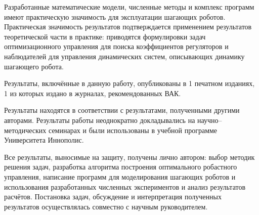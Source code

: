 Разработанные математические модели, численные методы и комплекс программ имеют практическую значимость для эксплуатации шагающих роботов. Практическая значимость результатов подтверждается применением результатов теоретической части в практике: приводятся формулировки задач оптимизационного управления для поиска коэффициентов регуляторов и наблюдателей для управления динамических систем, описывающих динамику шагающего робота. 

{\reliability} 

Результаты, включённые в данную работу, опубликованы в 1 печатном изданиях, 1 из которых издано в журналах, рекомендованных ВАК.
\begin{comment}
, 1 --- в периодических научных журналах, индексируемых \textit{Web of Science} и \textit{Scopus}. 
\end{comment}

Результаты находятся в соответствии с результатами, полученными другими авторами. Результаты работы неоднократно докладывались на научно--методических семинарах и были использованы в учебной программе Университета Иннополис.

{\contribution} 

Все результаты, выносимые на защиту, получены лично автором: выбор методик решения задач, разработка алгоритма построения оптимального робастного управления, написание программ для моделирования шагающих роботов и использования разработанных численных экспериментов и анализ результатов расчётов. Постановка задач, обсуждение и интерпретация полученных результатов осуществлялась совместно с научным руководителем.